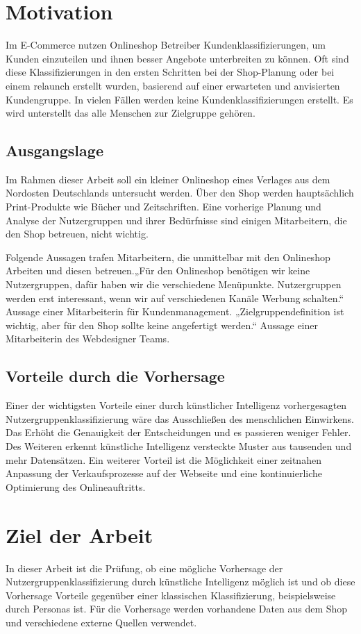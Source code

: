 \section{Motivation}
Im E-Commerce nutzen Onlineshop Betreiber Kundenklassifizierungen, um Kunden einzuteilen und ihnen besser Angebote unterbreiten zu können. Oft sind diese Klassifizierungen in den ersten Schritten bei der Shop-Planung oder bei einem \Gls{relaunch} erstellt wurden, basierend auf einer erwarteten und anvisierten Kundengruppe. In vielen Fällen werden keine Kundenklassifizierungen erstellt. Es wird unterstellt das alle Menschen zur Zielgruppe gehören.
\subsection{Ausgangslage}
Im Rahmen dieser Arbeit soll ein kleiner Onlineshop eines Verlages aus dem Nordosten Deutschlands untersucht werden. Über den Shop werden hauptsächlich Print-Produkte wie Bücher und Zeitschriften. Eine vorherige Planung und Analyse der Nutzergruppen und ihrer Bedürfnisse sind einigen Mitarbeitern, die den Shop betreuen, nicht wichtig.\vspace{0.2cm}

Folgende Aussagen trafen Mitarbeitern, die unmittelbar mit den Onlineshop Arbeiten und diesen betreuen.„Für den Onlineshop benötigen wir keine Nutzergruppen, dafür haben wir die verschiedene Menüpunkte. Nutzergruppen werden erst interessant, wenn wir auf verschiedenen Kanäle Werbung schalten.“ Aussage einer Mitarbeiterin für Kundenmanagement. „Zielgruppendefinition ist wichtig, aber für den Shop sollte keine angefertigt werden.“ Aussage einer Mitarbeiterin des Webdesigner Teams.
\subsection{Vorteile durch die Vorhersage}
Einer der wichtigsten Vorteile einer durch künstlicher Intelligenz vorhergesagten Nutzergruppenklassifizierung wäre das Ausschließen des menschlichen Einwirkens. Das Erhöht die Genauigkeit der Entscheidungen und es passieren weniger Fehler. Des Weiteren erkennt künstliche Intelligenz versteckte Muster aus tausenden und mehr Datensätzen. Ein weiterer Vorteil ist die Möglichkeit einer zeitnahen Anpassung der Verkaufsprozesse auf der Webseite und eine kontinuierliche Optimierung des Onlineauftritts.
\section{Ziel der Arbeit}
In dieser Arbeit ist die Prüfung, ob eine mögliche Vorhersage der Nutzergruppenklassifizierung durch künstliche Intelligenz möglich ist und ob diese Vorhersage Vorteile gegenüber einer klassischen Klassifizierung, beispielsweise durch Personas ist. Für die Vorhersage werden vorhandene Daten aus dem Shop und verschiedene externe Quellen verwendet.\vspace{0.2cm}


